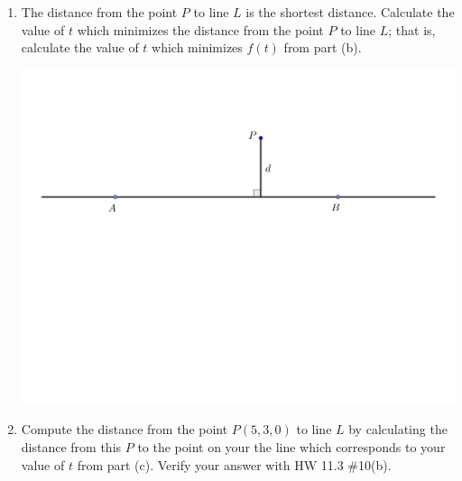 \documentclass[12pt]{article}
\newif\ifans
\begin{document}
\begin{enumerate}
\begin{enumerate}
\ifans{\fbox{\parbox{1\linewidth}{Your answer to this part depends on your parametric equations from part (a).  Using the parameterization given the distance from $P$ to an arbitrary point on line $L$ is given by $f(t)=\sqrt{(4-t)^2+(3-3t)^2+1}$.}}} \fi

\item The distance from the point $P$ to line $L$ is the shortest distance.  Calculate the value of $t$ which minimizes the distance from the point $P$ to line $L$; that is, calculate the value of $t$ which minimizes $f(t)$ from part (b).

\begin{center}
\includegraphics[scale=0.5]{length.pdf}
\end{center}

\ifans{\fbox{$t=\frac{13}{10}$; again, this depends on your parameterization of the line.}} \fi

\item Compute the distance from the point $P(5,3,0)$ to line $L$ by calculating the distance from this $P$ to the point on your the line which corresponds to your value of $t$ from part (c).  Verify your answer with HW 11.3 \#10(b).

\ifans{\fbox{$d=\sqrt{\frac{91}{10}}$}} \fi

\end{enumerate}


\end{enumerate}
\end{document}
